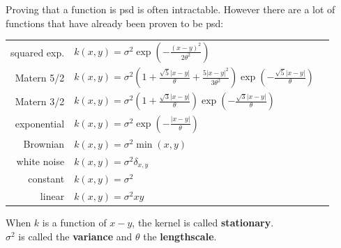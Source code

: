 \documentclass{beamer}
\begin{document}
\begin{frame}{}
Proving that a function is psd is often intractable. However there are a lot of functions that have already been proven to be psd:\\
\vspace{2mm}
\scriptsize
\begin{tabular}{rlN}
    squared exp. & $\displaystyle k(x,y) = \sigma^2 \exp \left(- \frac{(x-y)^2}{2 \theta^2} \right)$ &\\[4mm]
    Matern 5/2 & $\displaystyle k(x,y) = \sigma^2 \left(1 + \frac{\sqrt{5}|x-y|}{\theta} + \frac{5|x-y|^2}{3 \theta^2} \right) \exp \left(- \frac{\sqrt{5}|x-y|}{\theta} \right)$ &\\[4mm]
    Matern 3/2 & $\displaystyle k(x,y) = \sigma^2 \left(1 + \frac{\sqrt{3}|x-y|}{\theta} \right) \exp \left(- \frac{\sqrt{3}|x-y|}{\theta} \right)$ &\\[4mm]
    exponential & $\displaystyle k(x,y) = \sigma^2 \exp \left(- \frac{|x-y|}{\theta} \right)$ &\\[4mm]
    Brownian & $ \displaystyle k(x,y) = \sigma^2 \min (x,y) $ &\\[4mm]
    white noise & $ \displaystyle k(x,y) = \sigma^2 \delta_{x,y} $ &\\[4mm]
    constant & $ \displaystyle k(x,y) = \sigma^2 $ &\\[4mm]
    linear & $ \displaystyle k(x,y) = \sigma^2 xy $ &\\[4mm]
\end{tabular}
\vspace{2mm}
\normalsize
When $k$ is a function of $x-y$, the kernel is called \textbf{stationary}.\\
$\sigma^2$ is called the \textbf{variance} and $\theta$ the \textbf{lengthscale}.
\end{frame}
\end{document}
